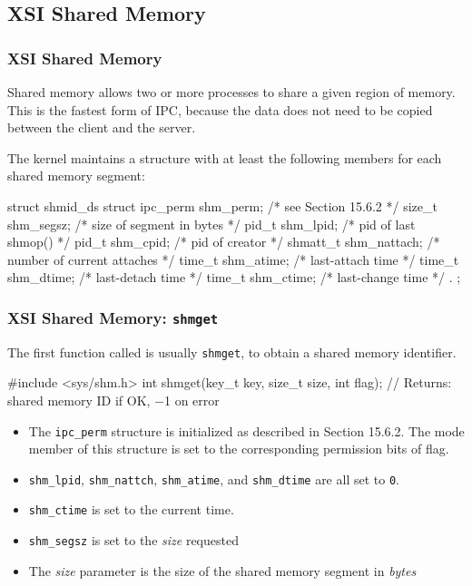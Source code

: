 \documentclass[newPxFont,sthlmFooter,nooffset]{beamer}
\begin{document}
\subsection{XSI Shared Memory}

\begin{frame}[t, fragile]
  \frametitle{XSI Shared Memory}
Shared memory allows two or more processes to share a given region of memory. This is the fastest form of IPC, because the data does not need to be copied between the client and the server.

The kernel maintains a structure with at least the following members for each shared memory segment:
\begin{codedefnb}
struct shmid_ds {
  struct ipc_perm  shm_perm;     /* see Section 15.6.2 */
  size_t           shm_segsz;    /* size of segment in bytes */
  pid_t            shm_lpid;     /* pid of last shmop() */
  pid_t            shm_cpid;     /* pid of creator */
  shmatt_t         shm_nattach;  /* number of current attaches */
  time_t           shm_atime;    /* last-attach time */
  time_t           shm_dtime;    /* last-detach time */
  time_t           shm_ctime;    /* last-change time */
  .
};
\end{codedefnb}
\end{frame}



\begin{frame}[t, fragile]
  \frametitle{XSI Shared Memory: \texttt{shmget}}
The first function called is usually \texttt{shmget}, to obtain a shared memory identifier.
\begin{codedef}
#include <sys/shm.h>
int shmget(key_t key, size_t size, int flag);
// Returns: shared memory ID if OK, −1 on error
\end{codedef}
\begin{itemize}
\item The \texttt{ipc\_perm} structure is initialized as described in Section 15.6.2. The mode member of this structure is set to the corresponding permission bits of flag.
\item \texttt{shm\_lpid}, \texttt{shm\_nattch}, \texttt{shm\_atime}, and \texttt{shm\_dtime} are all set to \texttt{0}.
\item \texttt{shm\_ctime} is set to the current time.
\item \texttt{shm\_segsz} is set to the \textit{size} requested
\item The \textit{size} parameter is the size of the shared memory segment in \textit{bytes}
\end{itemize}
\end{frame}
\end{document}
